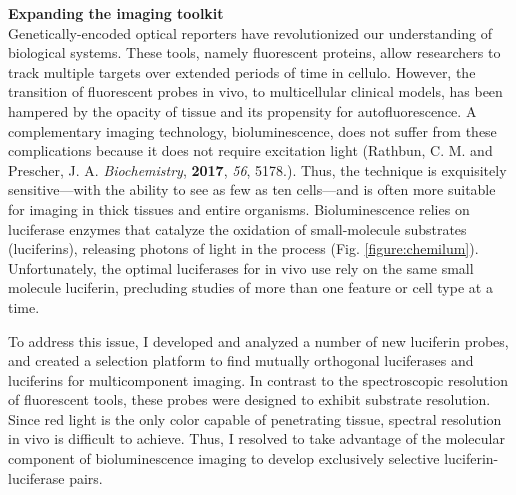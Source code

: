 \documentclass[11pt]{article}
\begin{document}
\textbf{Expanding the imaging toolkit}\\
Genetically-encoded optical reporters have revolutionized our understanding of biological systems. These tools, namely fluorescent proteins, allow researchers to track multiple targets over extended periods of time in cellulo. However, the transition of fluorescent probes in vivo, to multicellular clinical models, has been hampered by the opacity of tissue and its propensity for autofluorescence. A complementary imaging technology, bioluminescence, does not suffer from these complications because it does not require excitation light (Rathbun, C. M. and Prescher, J. A. \textit{Biochemistry}, \textbf{2017}, \textit{56}, 5178.). Thus, the technique is exquisitely sensitive—with the ability to see as few as ten cells—and is often more suitable for imaging in thick tissues and entire organisms. Bioluminescence relies on luciferase enzymes that catalyze the oxidation of small-molecule substrates (luciferins), releasing photons of light in the process (Fig. \ref{figure:chemilum}). Unfortunately, the optimal luciferases for in vivo use rely on the same small molecule luciferin, precluding studies of more than one feature or cell type at a time.

To address this issue, I developed and analyzed a number of new luciferin probes, and created a selection platform to find mutually orthogonal luciferases and luciferins for multicomponent imaging. In contrast to the spectroscopic resolution of fluorescent tools, these probes were designed to exhibit substrate resolution. Since red light is the only color capable of penetrating tissue, spectral resolution in vivo is difficult to achieve. Thus, I resolved to take advantage of the molecular component of bioluminescence imaging to develop exclusively selective luciferin-luciferase pairs.
\end{document}

